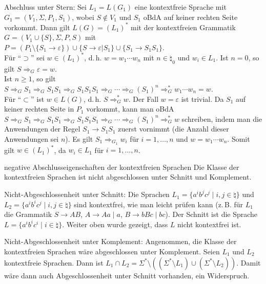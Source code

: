 \begin{Beweis}
    Abschluss unter Stern:
    Sei $L_1 = L(G_1)$ eine kontextfreie Sprache mit
    $G_1 = (V_1, \Sigma, P_1, S_1)$, wobei $S \notin V_1$ und
    $S_1$ oBdA auf keiner rechten Seite vorkommt.
    Dann gilt $L(G) = (L_1)^\ast$ mit der kontextfreien Grammatik
    $G = (V_1 \cup \{S\}, \Sigma, P, S)$ mit\\
    $P = (P_1 \setminus \{S_1 \rightarrow \varepsilon\}) \cup
    \{S \rightarrow \varepsilon | S_1\} \cup \{S_1 \rightarrow S_1 S_1\}$.\\
    Für "`$\supset$"' sei $w \in (L_1)^\ast$, d.\,h.
    $w = w_1 \dotsb w_n$ mit $n \in \natural_0$ und $w_i \in L_1$.
    Ist $n = 0$, so gilt $S \Rightarrow_G \varepsilon = w$.\\
    Ist $n \ge 1$, so gilt $S \Rightarrow_G S_1 \Rightarrow_G S_1 S_1
    \Rightarrow_G S_1 S_1 S_1 \Rightarrow_G \dotsb \Rightarrow_G (S_1)^n
    \Rightarrow_G^\ast w_1 \dotsb w_n = w$.\\
    Für "`$\subset$"' ist $w \in L(G)$, d.\,h. $S \Rightarrow_G^\ast w$.
    Der Fall $w = \varepsilon$ ist trivial.
    Da $S_1$ auf keiner rechten Seite in $P_1$ vorkommt, kann man oBdA
    $S \Rightarrow_G S_1 \Rightarrow_G S_1 S_1
    \Rightarrow_G S_1 S_1 S_1 \Rightarrow_G \dotsb \Rightarrow_G (S_1)^n
    \Rightarrow_G^\ast w$ schreiben, indem man die Anwendungen der Regel
    $S_1 \rightarrow S_1 S_1$ zuerst vornimmt
    (die Anzahl dieser Anwendungen sei $n$).
    Es gilt $S_1 \Rightarrow_{G_1} w_i$ für $i = 1, \dotsc, n$ und
    $w = w_1 \dotsb w_n$.
    Somit gilt $w \in (L_1)^\ast$, da $w_i \in L_1$ für $i = 1, \dotsc, n$.
\end{Beweis}

\linie

\begin{Satz}{negative Abschlusseigenschaften der kontextfreien Sprachen}
    Die Klasse der kontextfreien Sprachen ist nicht abgeschlossen unter
    Schnitt und Komplement.
\end{Satz}

\begin{Beweis}
    Nicht-Abgeschlossenheit unter Schnitt:
    Die Sprachen $L_1 = \{a^i b^j c^j \;|\; i, j \in \natural\}$ und
    $L_2 = \{a^i b^i c^j \;|\; i, j \in \natural\}$ sind kontextfrei,
    wie man leicht prüfen kann
    (z.\,B. für $L_1$ die Grammatik $S \rightarrow AB$,
    $A \rightarrow Aa \;|\; a$, $B \rightarrow bBc \;|\; bc$).
    Der Schnitt ist die Sprache $L = \{a^i b^i c^i \;|\; i \in \natural\}$.
    Weiter oben wurde gezeigt, dass $L$ nicht kontextfrei ist.

    Nicht-Abgeschlossenheit unter Komplement:
    Angenommen, die Klasse der kontextfreien Sprachen wäre abgeschlossen
    unter Komplement.
    Seien $L_1$ und $L_2$ kontextfreie Sprachen.
    Dann ist $L_1 \cap L_2 = \Sigma^\ast \setminus
    ((\Sigma^\ast \setminus L_1) \cup (\Sigma^\ast \setminus L_2))$.
    Damit wäre dann auch Abgeschlossenheit unter Schnitt vorhanden,
    ein Widerspruch.
\end{Beweis}

